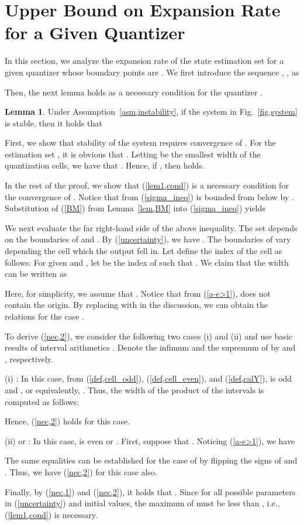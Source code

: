 \documentclass[a4paper, 11pt]{article}
\makeatletter
\theoremstyle{definition}
\newtheorem{lem}{Lemma}
\newenvironment{pf}[1][\proofname]{\par\pushQED{\qed}
 \normalfont\topsep6\p@\@plus6\p@\relax\trivlist\item[\hskip\labelsep\bfseries#1\@addpunct{.}]
 \ignorespaces}{\popQED\endtrivlist\@endpefalse}
\newcommand{\fref}[1]{Fig.~\ref{#1}}
\makeatother
\begin{document}
\section{Upper Bound on Expansion Rate for a Given Quantizer}\label{sec,gnec}
In this section, we analyze the expansion rate of the state estimation set
for a given quantizer whose boundary points are .
We first introduce the sequence , , as

Then, the next lemma holds as a necessary condition for the quantizer
.

\begin{lem}\label{lem,generalnec}
 Under Assumption~\ref{asm,instability}, if the system in \fref{fig,system}
is stable, then it holds that

\end{lem}

\begin{pf}
First, we show that stability of the system requires convergence of .
For the estimation set , it is obvious that
.
Letting  be the smallest width of the quantization cells, we have that
.
Hence, if , then 
holds.

In the rest of the proof, we show that (\ref{lem1,cond}) is a necessary condition
for the convergence of .
Notice that from (\ref{sigma_ineq})  is bounded from below by
. 
Substitution of (\ref{BM}) from Lemma~\ref{lem,BM} into (\ref{sigma_ineq}) yields


We next evaluate the far right-hand side of the above inequality.
The set  depends on the boundaries of  and
.
By (\ref{uncertainty}), we have .
The boundaries of  vary depending the cell which the output
 fell in.
Let define the index  of the cell as follows:
For given  and , let  be the index of 
such that .
We claim that the width  can be written as

Here, for simplicity, we assume that .
Notice that from (\ref{a-e>1}),  does not contain the origin.
By replacing  with  in the discussion, we can obtain the
relations for the case .

To derive (\ref{nec,2}), we consider the following two cases (i) and (ii)
and use basic results of interval arithmetics \cite{Moore1966}.
Denote the infimum and the supremum of  by 
and , respectively.

(i) : In this case, from (\ref{def,cell_odd}),
(\ref{def,cell_even}), and (\ref{def,calY}),  is odd and ,
or equivalently, .
Thus, the width of the product of the intervals is computed as follows:

Hence, (\ref{nec,2}) holds for this case.

(ii)  or :
In this case,  is even or .
First, suppose that .
Noticing (\ref{a-e>1}), we have

The same equalities can be established for the case of 
by flipping the signs of  and .
Thus, we have (\ref{nec,2}) for this case also.

Finally, by (\ref{nec,1}) and (\ref{nec,2}), it holds that
.
Since  for all possible parameters in (\ref{uncertainty})
and initial values, the maximum of  must be less than ,
i.e., (\ref{lem1,cond}) is necessary.
\end{pf}
\end{document}
